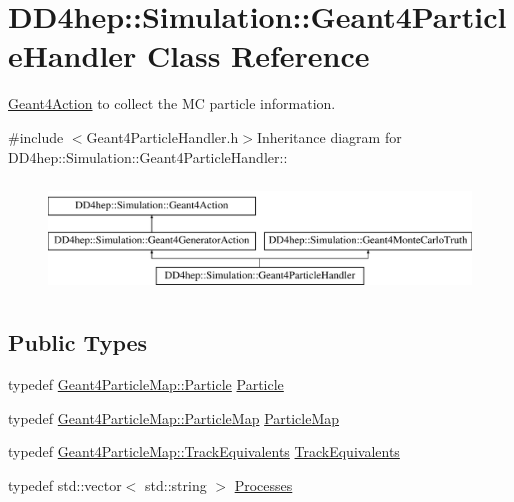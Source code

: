 \hypertarget{class_d_d4hep_1_1_simulation_1_1_geant4_particle_handler}{
\section{DD4hep::Simulation::Geant4ParticleHandler Class Reference}
\label{class_d_d4hep_1_1_simulation_1_1_geant4_particle_handler}
}


\hyperlink{class_d_d4hep_1_1_simulation_1_1_geant4_action}{Geant4Action} to collect the MC particle information.  


{\ttfamily \#include $<$Geant4ParticleHandler.h$>$}Inheritance diagram for DD4hep::Simulation::Geant4ParticleHandler::\begin{figure}[H]
\begin{center}
\leavevmode
\includegraphics[height=3cm]{class_d_d4hep_1_1_simulation_1_1_geant4_particle_handler}
\end{center}
\end{figure}
\subsection*{Public Types}
\begin{DoxyCompactItemize}
\item 
typedef \hyperlink{class_d_d4hep_1_1_simulation_1_1_geant4_particle}{Geant4ParticleMap::Particle} \hyperlink{class_d_d4hep_1_1_simulation_1_1_geant4_particle_handler_a69214f487c50f6fd550571f37e715117}{Particle}
\item 
typedef \hyperlink{class_d_d4hep_1_1_simulation_1_1_geant4_particle_map_a065c5fb0629285022b9aa2a628bffef3}{Geant4ParticleMap::ParticleMap} \hyperlink{class_d_d4hep_1_1_simulation_1_1_geant4_particle_handler_a79cf5fe4ceb492dff4d3458306a08973}{ParticleMap}
\item 
typedef \hyperlink{class_d_d4hep_1_1_simulation_1_1_geant4_particle_map_aba09f5fcb2dd5874d129660ad4454a21}{Geant4ParticleMap::TrackEquivalents} \hyperlink{class_d_d4hep_1_1_simulation_1_1_geant4_particle_handler_a6163ec58bca837bb4544fd6e2f4bc05a}{TrackEquivalents}
\item 
typedef std::vector$<$ std::string $>$ \hyperlink{class_d_d4hep_1_1_simulation_1_1_geant4_particle_handler_a80c1482fd25ec687f429854033ac3f79}{Processes}
\end{DoxyCompactItemize}

